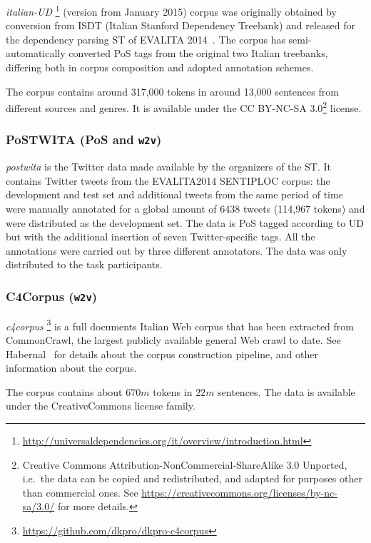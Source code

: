 \documentclass[11pt]{article}
\newcommand\wtv{\texttt{w2v}\xspace}
\begin{document}
\emph{italian-UD}%
\footnote{\url{http://universaldependencies.org/it/overview/introduction.html}}
(version from January 2015) corpus was originally obtained by conversion from
ISDT (Italian Stanford Dependency Treebank) and released for the dependency
parsing ST of EVALITA 2014~\cite{Bosco2014}.
The corpus has semi-automatically converted PoS tags from the original two
Italian treebanks, differing both in corpus composition and adopted annotation
schemes.

The corpus contains around 317,000 tokens in around 13,000 sentences from
different sources and genres.  
It is available under the CC BY-NC-SA 3.0\footnote{Creative Commons
Attribution-NonCommercial-ShareAlike 3.0 Unported, i.e.~the data can be copied
and redistributed, and adapted for purposes other than commercial ones. See
\url{https://creativecommons.org/licenses/by-nc-sa/3.0/} for more details.}
license.


\subsubsection{PoSTWITA (PoS and \wtv)} %
\label{sssec:postwita}
\emph{postwita} is the Twitter data made available by the organizers of the ST.
It contains Twitter tweets from the EVALITA2014 SENTIPLOC corpus: the
development and test set and additional tweets from the same period of time
were manually annotated for a global amount of 6438 tweets (114,967 tokens) and
were distributed as the development set. 
The data is PoS tagged according to UD but with the additional insertion of
seven Twitter-specific tags.
All the annotations were carried out by three different annotators.
The data was only distributed to the task participants.


\subsubsection{C4Corpus (\wtv)} %
\emph{c4corpus}%
\footnote{\url{https://github.com/dkpro/dkpro-c4corpus}} is a full documents
Italian Web corpus that has been extracted from CommonCrawl, the largest
publicly available general Web crawl to date. 
See Habernal~ for details about the corpus
construction pipeline, and other information about the corpus.

The corpus contains about $670m$ tokens in $22m$ sentences.
The data is available under the CreativeCommons license
family. 
\end{document}
